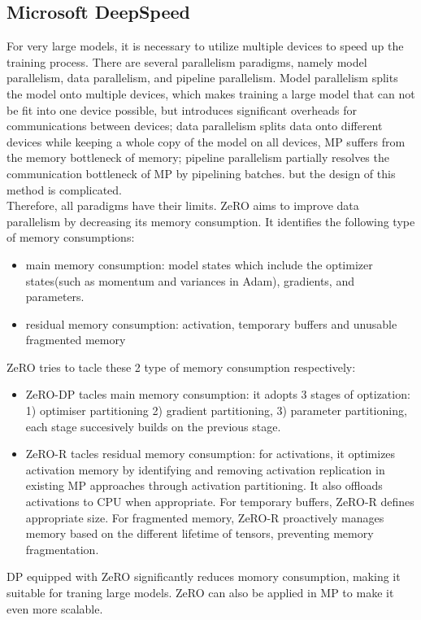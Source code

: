 \subsection{Microsoft DeepSpeed}
For very large models, it is necessary to utilize multiple devices to speed up the training process. There are several parallelism paradigms, namely model parallelism, data parallelism, and pipeline parallelism. Model parallelism splits the model onto multiple devices, which makes training a large model that can not be fit into one device possible, but introduces significant overheads for communications between devices; data parallelism splits data onto different devices while keeping a whole copy of the model on all devices, MP suffers from the memory bottleneck of memory; pipeline parallelism partially resolves the communication bottleneck of MP by pipelining batches. but the design of this method is complicated.\\
Therefore, all paradigms have their limits. ZeRO aims to improve data parallelism by decreasing its memory consumption. It identifies the following type of memory consumptions:\\
\begin{itemize}
    \item main memory consumption: model states which include the optimizer states(such as momentum and variances in Adam), gradients, and parameters.\cite*{https://doi.org/10.48550/arxiv.1910.02054}
    \item residual memory consumption: activation, temporary buffers and unusable fragmented memory\cite*{https://doi.org/10.48550/arxiv.1910.02054}
\end{itemize}
ZeRO tries to tacle these 2 type of memory consumption respectively:\\
\begin{itemize}
    \item ZeRO-DP tacles main memory consumption: it adopts 3 stages of optization: 1) optimiser partitioning 2) gradient partitioning, 3) parameter partitioning, each stage succesively builds on the previous stage.\cite*{https://doi.org/10.48550/arxiv.1910.02054}
    \item ZeRO-R tacles residual memory consumption: for activations, it optimizes activation
    memory by identifying and removing activation replication in existing MP approaches through
    activation partitioning. It also offloads activations to CPU when appropriate. For temporary buffers, ZeRO-R defines appropriate size. For fragmented memory, ZeRO-R proactively manages memory
    based on the different lifetime of tensors, preventing memory fragmentation.\cite*{https://doi.org/10.48550/arxiv.1910.02054}
\end{itemize}
DP equipped with ZeRO significantly reduces momory consumption, making it suitable for traning large models. ZeRO can also be applied in MP to make it even more scalable.\\
